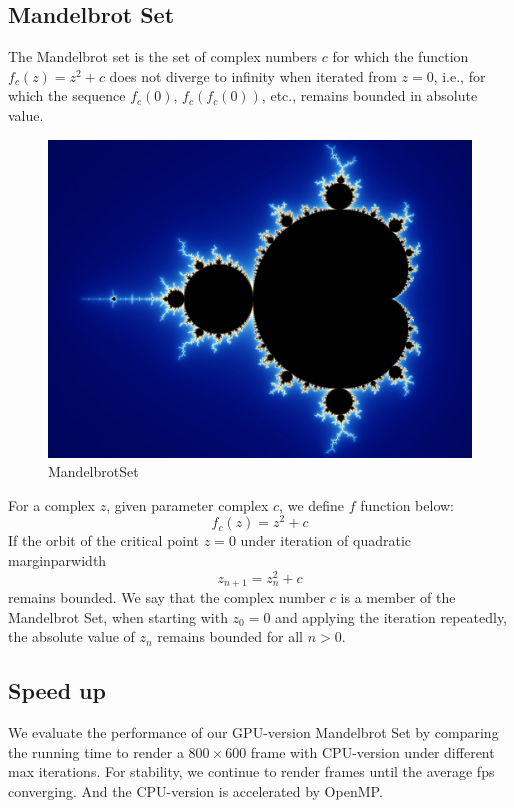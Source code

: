 \documentclass{article}
\begin{document}
    \subsection{Mandelbrot Set}
        The Mandelbrot set is the set of complex numbers $c$ for which the function 
        $f_{c}(z)=z^{2}+c$ does not diverge to infinity when iterated from $z=0$, 
        i.e., for which the sequence $f_{c}(0)$, $f_{c}(f_{c}(0))$, etc., remains 
        bounded in absolute value.\cite{wiki:Mandelbrotset}
        \begin{figure}[H]
        	\centering
        	\includegraphics[width=0.6\linewidth]{mandelbrotset.jpg}
        	\caption{MandelbrotSet}
        \end{figure}
        For a complex $z$, given parameter complex $c$, we define $f$ function below:
            \begin{equation}
                f_c(z)=z^2+c
            \end{equation}
        If the orbit of the critical point $z=0$ under iteration of quadratic marginparwidth
            \begin{equation}
                z_{n+1}=z_n^2+c
            \end{equation}
        remains bounded. We say that the complex number $c$ is a member of the Mandelbrot Set, when 
        starting with $z_0=0$ and applying the iteration repeatedly, the absolute value of $z_n$ remains 
        bounded for all $n>0$.

    \subsection{Speed up}
        We evaluate the performance of our GPU-version Mandelbrot Set by comparing the running time to render a $800\times 600$ frame with CPU-version under different max iterations. For stability, we continue to render frames until the average fps converging. And the CPU-version is accelerated by OpenMP.
\end{document}
